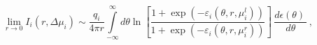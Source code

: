 \begin{equation}
\lim\limits_{r\rightarrow 0}I_{i}(r,\Delta \mu _{i})\sim \frac{q_{i}}{4\pi r}%
\int\limits_{-\infty }^{\infty }d\theta \ln \left[ \frac{1+\exp
(-\varepsilon _{i}(\theta ,r,\mu _{i}^{l}))}{1+\exp (-\varepsilon
_{i}(\theta ,r,\mu _{i}^{r}))}\right] \,\frac{d\epsilon (\theta )\,}{d\theta 
}\,,  \label{ya}
\end{equation}%
